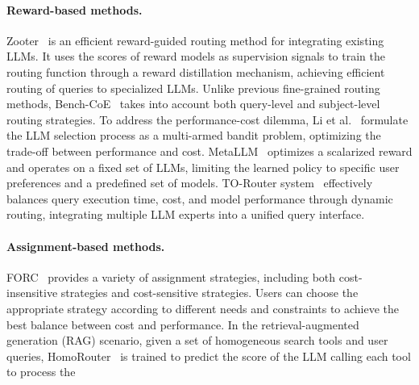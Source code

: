\documentclass{article}
\begin{document}
\paragraph{Reward-based methods.}
Zooter~\cite{lu2024routing} is an efficient reward-guided routing method for integrating existing LLMs.
It uses the scores of reward models as supervision signals to train the routing function through a reward distillation mechanism, achieving efficient routing of queries to specialized LLMs.
Unlike previous fine-grained routing methods, Bench-CoE~\cite{wang2024bench}  
takes into account both query-level and subject-level routing strategies.
To address the performance-cost dilemma, Li et al.~ formulate the LLM selection process as a multi-armed bandit problem, optimizing the trade-off between performance and cost.
MetaLLM~\cite{nguyen2024metallm} optimizes a scalarized reward and operates on a fixed set of LLMs, limiting the learned policy to specific user preferences and a predefined set of models.
TO-Router system~\cite{stripelis2024tensoropera} effectively balances query execution time, cost, and model performance through dynamic routing, integrating multiple LLM experts into a unified query interface. 





\paragraph{Assignment-based methods.}
FORC~\cite{vsakota2024fly} provides a variety of assignment strategies, including both cost-insensitive strategies and cost-sensitive strategies. Users can choose the appropriate strategy according to different needs and constraints to achieve the best balance between cost and performance.
In the retrieval-augmented generation (RAG) scenario, given a set of homogeneous search tools and user queries, HomoRouter~\cite{mu2024adaptive} is trained to predict the score of the LLM calling each tool to process the 
\end{document}
